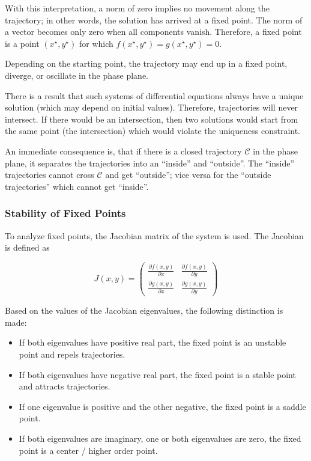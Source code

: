 With this interpretation, a norm of zero implies no movement along the trajectory; in other words, the solution has arrived at a fixed point. The norm of a vector becomes only zero when all components vanish. Therefore, a fixed point is a point $(x^\star,y^\star)$ for which $f(x^\star, y^\star) = g(x^\star,y^\star) = 0$.

Depending on the starting point, the trajectory may end up in a fixed
point, diverge, or oscillate in the phase plane.

There is a result that such systems of differential equations always
have a unique solution (which may depend on initial values). Therefore, trajectories will never intersect. If there would be an intersection, then two solutions would start from the same point (the intersection) which would violate the uniqueness constraint.

An immediate consequence is, that if there is a closed trajectory
$\mathcal{C}$ in the phase plane, it separates the trajectories into an ``inside'' and ``outside''. The ``inside'' trajectories cannot cross $\mathcal{C}$ and get ``outside''; vice versa for the ``outside trajectories'' which cannot get ``inside''.


\subsubsection{Stability of Fixed Points}

To analyze fixed points, the Jacobian matrix of the system is used. The Jacobian is defined as

\[ J(x,y) = \left( \begin{array}{cc}
\frac{\partial f(x,y)}{\partial x} & \frac{\partial f(x,y)}{\partial y}  \\
\frac{\partial g(x,y)}{\partial x} & \frac{\partial g(x,y)}{\partial y}
\end{array} \right) \]

Based on the values of the Jacobian eigenvalues, the following
distinction is made:

\begin{itemize}
\item
  If both eigenvalues have positive real part, the fixed point is an
  unstable point and repels trajectories.
\item
  If both eigenvalues have negative real part, the fixed point is a
  stable point and attracts trajectories.
\item
  If one eigenvalue is positive and the other negative, the fixed point   is a saddle point.
\item
  If both eigenvalues are imaginary, one or both eigenvalues are zero, the fixed point is a center / higher order point.
\end{itemize}

